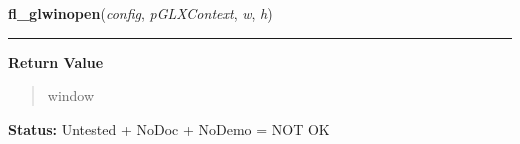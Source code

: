     \label{xformslib:library:fl_glwinopen}

    \vspace{0.5ex}

\hspace{.8\funcindent}\begin{boxedminipage}{\funcwidth}

    \raggedright \textbf{fl\_glwinopen}(\textit{config}, \textit{pGLXContext}, \textit{w}, \textit{h})

    \vspace{-1.5ex}

    \rule{\textwidth}{0.5\fboxrule}
\setlength{\parskip}{2ex}
\setlength{\parskip}{1ex}
      \textbf{Return Value}
    \vspace{-1ex}

      \begin{quote}
      window

      \end{quote}

\textbf{Status:} Untested + NoDoc + NoDemo = NOT OK



    \end{boxedminipage}

    \label{xformslib:library:fl_add_chart}

    \vspace{0.5ex}

